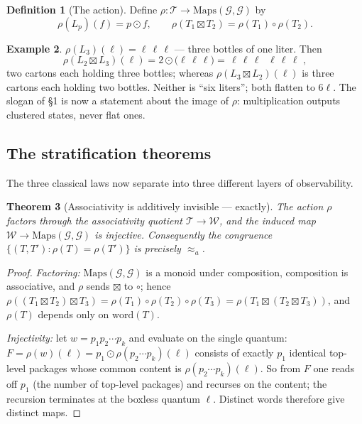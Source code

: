 \documentclass[11pt]{article}
\newcommand{\cT}{\mathcal{T}}   %
\newcommand{\cW}{\mathcal{W}}   %
\newcommand{\cG}{\mathcal{G}}   %
\newcommand{\pkg}[1]{\boxed{#1}}
\newcommand{\act}{\rho}
\numberwithin{equation}{section}
\theoremstyle{plain}
\newtheorem{theorem}{Theorem}[section]
\theoremstyle{definition}
\newtheorem{definition}[theorem]{Definition}
\newtheorem{example}[theorem]{Example}
\theoremstyle{remark}
\begin{document}
\begin{definition}[The action]\label{def:action}
Define $\act \colon \cT \to \mathrm{Maps}(\cG, \cG)$ by
\[
\act(L_p)(f) = p \odot f,
\qquad
\act(T_1 \boxtimes T_2) = \act(T_1) \circ \act(T_2).
\]
\end{definition}

\begin{example}\label{ex:liters}
$\act(L_3)(\ell) = \pkg{\ell}\,\pkg{\ell}\,\pkg{\ell}$ --- three bottles of one liter.
Then
\[
\act(L_2 \boxtimes L_3)(\ell)
= 2 \odot \bigl(\pkg{\ell}\,\pkg{\ell}\,\pkg{\ell}\bigr)
= \pkg{\,\pkg{\ell}\,\pkg{\ell}\,\pkg{\ell}\,}\;\pkg{\,\pkg{\ell}\,\pkg{\ell}\,\pkg{\ell}\,}\,,
\]
two cartons each holding three bottles; whereas $\act(L_3 \boxtimes L_2)(\ell)$ is
three cartons each holding two bottles. Neither is ``six liters''; both flatten to
$6\ell$. The slogan of \S1 is now a statement about the image of $\act$:
multiplication outputs clustered states, never flat ones.
\end{example}

\subsection{The stratification theorems}

The three classical laws now separate into three different layers of observability.

\begin{theorem}[Associativity is additively invisible --- exactly]\label{thm:assoc}
The action $\act$ factors through the associativity quotient $\cT \to \cW$, and the
induced map $\cW \to \mathrm{Maps}(\cG,\cG)$ is injective. Consequently the congruence
$\{(T, T') : \act(T) = \act(T')\}$ is precisely $\approx_a$.
\end{theorem}

\begin{proof}
\emph{Factoring:} $\mathrm{Maps}(\cG,\cG)$ is a monoid under composition, composition
is associative, and $\act$ sends $\boxtimes$ to $\circ$; hence
$\act((T_1 \boxtimes T_2)\boxtimes T_3) = \act(T_1)\circ\act(T_2)\circ\act(T_3)
= \act(T_1 \boxtimes(T_2 \boxtimes T_3))$, and $\act(T)$ depends only on
$\mathrm{word}(T)$.

\emph{Injectivity:} let $w = p_1 p_2 \cdots p_k$ and evaluate on the single quantum:
$F = \act(w)(\ell) = p_1 \odot \act(p_2\cdots p_k)(\ell)$ consists of exactly $p_1$
identical top-level packages whose common content is $\act(p_2 \cdots p_k)(\ell)$.
So from $F$ one reads off $p_1$ (the number of top-level packages) and recurses on the
content; the recursion terminates at the boxless quantum $\ell$. Distinct words
therefore give distinct maps.
\end{proof}
\end{document}
